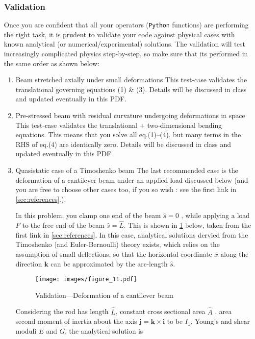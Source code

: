 \documentclass[11pt]{article}
\begin{document}
\subsubsection{Validation}
\label{sec:org5fd23fe}
Once you are confident that all your operators (\texttt{Python}  functions) are
performing the right task, it is prudent to validate your code against
physical cases with known analytical (or numerical/experimental) solutions.
The validation will test increasingly complicated physics step-by-step, so
make sure that its performed in the same order as shown below:
\begin{enumerate}
\item Beam stretched axially under small deformations
\label{sec:orgf1b8039}
This test-case validates the translational governing equations (1) \& (3).
Details will be discussed in class and updated eventually in this PDF.
\item Pre-stressed beam with residual curvature undergoing deformations in space
\label{sec:org62fe594}
This test-case validates the translational + two-dimensional bending
equations. This means that you solve all eq.(1)--(4), but many terms in the
RHS of eq.(4) are identically zero. Details will be discussed in class and
updated eventually in this PDF.
\item Quasistatic case of a Timoshenko beam
\label{sec:org77fa449}
The last recommended case is the deformation of a cantilever beam under an applied
load discussed below (and you are free to choose other cases too, if you so wish : see the
first link in \cref{sec:references}.).

In this problem, you clamp one end of the beam \(\hat{s}=0\) , while applying a load \(F\) to the free end of the beam \(\hat{s}=\hat{L}\). This is shown in \cref{p1_fig} below, taken
 from the first link in \cref{sec:references}. In this case, analytical solutions dervied from the Timoshenko (and
 Euler-Bernoulli) theory exists, which relies on the assumption of small
 deflections, so that the horizontal coordinate \(x\) along the direction
 \(\mathbf{k}\) can be approximated by the arc-length \(\hat{s}\).

\begin{figure}[htbp]
\centering
\texttt{[image: images/figure\_11.pdf]}
\caption{\label{p1_fig}
Validation---Deformation of a cantilever beam}
\end{figure}
Considering the rod has length
 \(\hat{L}\), constant cross sectional area \(\hat{A}\) , area second moment of
 inertia about the axis \(\mathbf{j}=\mathbf{k}\times\mathbf{i}\) to be
 \(\hat{I}_1\), Young's and shear moduli \(E\) and \(G\), the analytical solution is


\end{enumerate}
\end{document}
